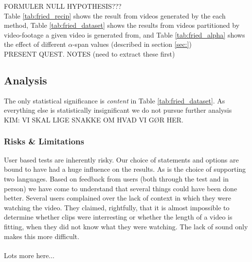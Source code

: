 FORMULER NULL HYPOTHESIS???\\
%



%
Table \ref{tab:fried_recip} shows the result from videos generated by the each method, Table \ref{tab:fried_dataset} shows the results from videos partitioned by video-footage a given video is generated from, and Table \ref{tab:fried_alpha} shows the effect of different $\alpha$-span values (described in section \ref{sec:})\\
%
PRESENT QUEST. NOTES (need to extract these first)
%
\subsection{Analysis}
%
The only statistical significance is \textit{content} in Table \ref{tab:fried_dataset}. As everything else is statistically insignificant we do not pursue further analysis KIM: VI SKAL LIGE SNAKKE OM HVAD VI GØR HER.
%
\subsubsection{Risks \& Limitations}
%
User based tests are inherently risky. Our choice of statements and options are bound to have had a huge influence on the results. As is the choice of supporting two languages. Based on feedback from users (both through the test and in person) we have come to understand that several things could have been done better. Several users complained over the lack of context in which they were watching the video. They claimed, rightfully, that it is almost impossible to determine whether clips were interresting or whether the length of a video is fitting, when they did not know what they were watching. The lack of sound only makes this more difficult.\\\\
%
Lots more here...
%
